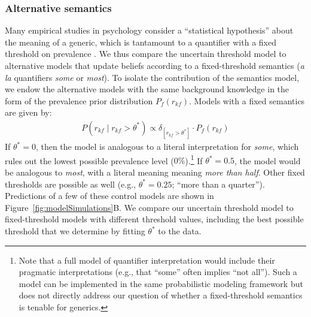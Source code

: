\documentclass[floatsintext,doc]{apa6}
\let\rmarkdownfootnote\footnote%
\def\footnote{\protect\rmarkdownfootnote}
\newcommand{\ndg}[1]{{\textcolor{Green}{[ndg: #1]}}}
\begin{document}
\subsubsection{Alternative semantics}

Many empirical studies in psychology consider a ``statistical hypothesis'' about the meaning of a generic, which is tantamount to a quantifier with a fixed threshold on prevalence \cite{Prasada2006, Leslie2008, Cimpian2010, Khemlani2012, Prasada2013, Brandone2014}.
We thus compare the uncertain threshold model to alternative models that update beliefs according to a fixed-threshold semantics (\emph{a la} quantifiers \emph{some} or \emph{most}). 
To isolate the contribution of the semantics model,  we endow the alternative models with the same background knowledge in the form of the prevalence prior distribution \(P_f(r_{kf})\).
Models with a fixed semantics are given by:
\begin{eqnarray}
P (r_{kf} \mid r_{kf} >  \theta^*) \propto \delta_{[r_{kf} > \theta^*]} \cdot P_f(r_{kf})  \label{eq:L0fixed}
\end{eqnarray}
If $\theta^* = 0$, then the model is analogous to a literal interpretation for \emph{some}, which rules out the lowest possible prevalence level ($0\%$).\footnote{Note that a full model of quantifier interpretation would include their pragmatic interpretations (e.g., that \enquote{some} often implies \enquote{not all}). Such a model can be implemented in the same probabilistic modeling framework \cite{Goodman2013} but does not directly address our question of whether a fixed-threshold semantics is tenable for generics.} 
If $\theta^* = 0.5$, the model would be analogous to \emph{most}, with a literal meaning meaning \emph{more than half}. 
Other fixed thresholds are possible as well (e.g., $\theta^* = 0.25$; \enquote{more than a quarter}).
Predictions of a few of these control models are shown in Figure~\ref{fig:modelSimulations}B.
We compare our uncertain threshold model to fixed-threshold models with different threshold values, including the best possible threshold that we determine by fitting $\theta^*$ to the data.
\end{document}
